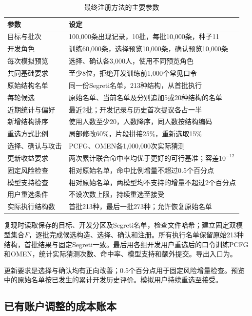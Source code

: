 \documentclass{crypto_report}
\begin{document}
\begin{table}[H]
\centering
\caption{最终注册方法的主要参数}\label{tab:registration-parameters}
\small
\begin{tabularx}{\linewidth}{@{}lX@{}}
\toprule
参数 & 设定 \\
\midrule
目标与批次 & 100,000条出现记录，10批，每批10,000条，种子11 \\
开发角色 & 训练60,000条，选择预览10,000条，确认预览10,000条 \\
每次模拟预览 & 选择、确认各3,000人，使用不同预览角色 \\
共同基础要求 & 至少8位，拒绝开发训练前1,000个常见口令 \\
原始结构名单 & 同一份Segreti名单，213种结构，从首批执行 \\
每轮候选 & 原始名单、当前名单及分别追加5或20种结构的名单 \\
近期统计与偏好 & 最近2批；开发记录与历史首次提议各占一半 \\
新增结构排序 & 使用人数至少20，人数降序，同人数按结构编码 \\
重选方式比例 & 局部修改60\%，片段拼接25\%，重新选取15\% \\
选择、确认与攻击 & PCFG、OMEN各1,000,000次实际猜测 \\
更新收益要求 & 两次累计联合命中率均优于更好的可行基准；容差$10^{-12}$ \\
固定风险检查 & 相对原始名单，命中比例增量不超过0.5个百分点 \\
模型支持检查 & 相对原始名单，两模型均不支持的增量不超过2个百分点 \\
用户重选条件 & 不设次数上限，持续重选至接受 \\
实际执行结构数 & 首批213种，最后一批273种；允许恢复原始名单 \\
\bottomrule
\end{tabularx}
\end{table}

复现时读取保存的目标、开发分区及Segreti名单，检查文件哈希；建立固定双模型集合$F$，逐批完成候选构造、选择、确认和注册。所有执行名单保留原始213种结构，首批结果与固定Segreti一致。最后用各组开发用户重选后的口令训练PCFG和OMEN，统计实际猜测次数、命中率、模型支持和额外提交。导出入口为\texttt{}。

更新要求是选择与确认均有正向改善；0.5个百分点用于固定风险增量检查。预览中的原始名单按已发生的累计开发历史评价。模拟用户持续重选至接受。

\subsection{已有账户调整的成本账本}\label{b.2-ux6210ux672cux8d26ux672c}
\end{document}
